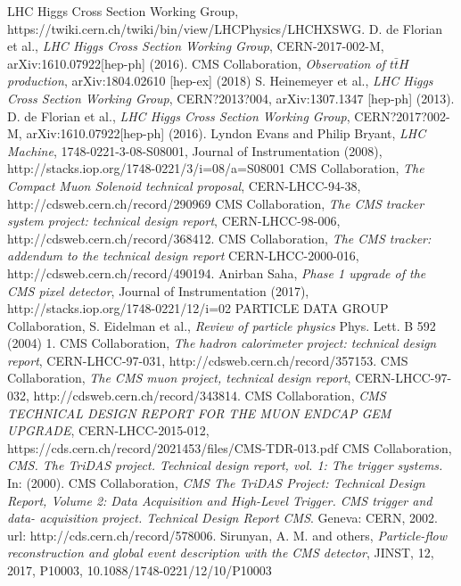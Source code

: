 \begin{thebibliography}{999}
		 LHC Higgs Cross Section Working Group, \\https://twiki.cern.ch/twiki/bin/view/LHCPhysics/LHCHXSWG.
		 D. de Florian et al., \emph{LHC Higgs Cross Section Working Group}, CERN-2017-002-M, arXiv:1610.07922[hep-ph] (2016).
		 CMS Collaboration, \emph{Observation of $t\bar{t}H$ production}, 	arXiv:1804.02610 [hep-ex] (2018)
		 S. Heinemeyer et al., \emph{LHC Higgs Cross Section Working Group}, CERN?2013?004, arXiv:1307.1347 [hep-ph] (2013).
		 D. de Florian et al., \emph{LHC Higgs Cross Section Working Group}, CERN?2017?002-M, arXiv:1610.07922[hep-ph] (2016).
		 Lyndon Evans and Philip Bryant, \emph{LHC Machine}, 1748-0221-3-08-S08001, Journal of Instrumentation (2008), http://stacks.iop.org/1748-0221/3/i=08/a=S08001
		 CMS Collaboration, \emph{The Compact Muon Solenoid technical proposal}, CERN-LHCC-94-38, http://cdsweb.cern.ch/record/290969
		  CMS Collaboration, \emph{The CMS tracker system project: technical design report}, CERN-LHCC-98-006, http://cdsweb.cern.ch/record/368412.
		  CMS Collaboration, \emph{The CMS tracker: addendum to the technical design report} CERN-LHCC-2000-016, http://cdsweb.cern.ch/record/490194.
		 Anirban Saha, \emph{Phase 1 upgrade of the CMS pixel detector}, Journal of Instrumentation (2017), http://stacks.iop.org/1748-0221/12/i=02
		 PARTICLE DATA GROUP Collaboration, S. Eidelman et al., \emph{Review of particle physics} Phys. Lett. B 592 (2004) 1.
		  CMS Collaboration, \emph{The hadron calorimeter project: technical design report}, CERN-LHCC-97-031, http://cdsweb.cern.ch/record/357153.
		 CMS Collaboration, \emph{The CMS muon project, technical design report}, CERN-LHCC-97-032, http://cdsweb.cern.ch/record/343814.
		 CMS Collaboration, \emph{CMS TECHNICAL DESIGN REPORT FOR THE MUON ENDCAP GEM UPGRADE}, CERN-LHCC-2015-012, https://cds.cern.ch/record/2021453/files/CMS-TDR-013.pdf
		 CMS Collaboration, \emph{CMS. The TriDAS project. Technical design report, vol. 1: The trigger systems.} In: (2000).
		 CMS Collaboration, \emph{CMS The TriDAS Project: Technical Design Report, Volume 2: Data Acquisition and High-Level Trigger. CMS trigger and data- acquisition project. Technical Design Report CMS}. Geneva: CERN, 2002. url: http://cds.cern.ch/record/578006.
		 Sirunyan, A. M. and others, \emph{Particle-flow reconstruction and global event description with the CMS detector}, JINST, 12, 2017, P10003, 10.1088/1748-0221/12/10/P10003

\end{thebibliography}
